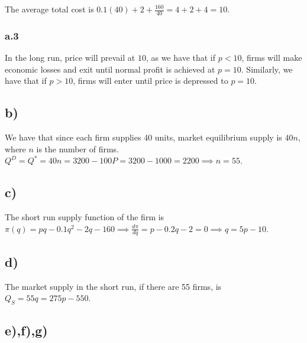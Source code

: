 \documentclass[12pt,letterpaper]{article}
\theoremstyle{definition}
\begin{document}
The average total cost is $0.1(40) + 2 + \frac{160}{40} = 4 + 2 + 4 = 10$.

\subsubsection*{a.3}

In the long run, price will prevail at $10$, as we have that if $p < 10$, firms
will make economic losses and exit until normal profit is achieved at $p = 10$.
Similarly, we have that if $p > 10$, firms will enter until price is depressed
to $p = 10$.

\subsection*{b)}

We have that since each firm supplies 40 units, market equilibrium supply is
$40n$, where $n$ is the number of firms. $Q^D = Q^* = 40n = 3200 - 100P = 3200 -1000 = 2200 \implies
n = 55$.

\subsection*{c)}

The short run supply function of the firm is $\pi(q) = pq - 0.1q^2 - 2q - 160
\implies \frac{d\pi}{dq} = p - 0.2q - 2 = 0 \implies q = 5p - 10$.

\subsection*{d)}

The market supply in the short run, if there are 55 firms, is $Q_S = 55q = 275p - 550$.

\subsection*{e),f),g)}
\end{document}
